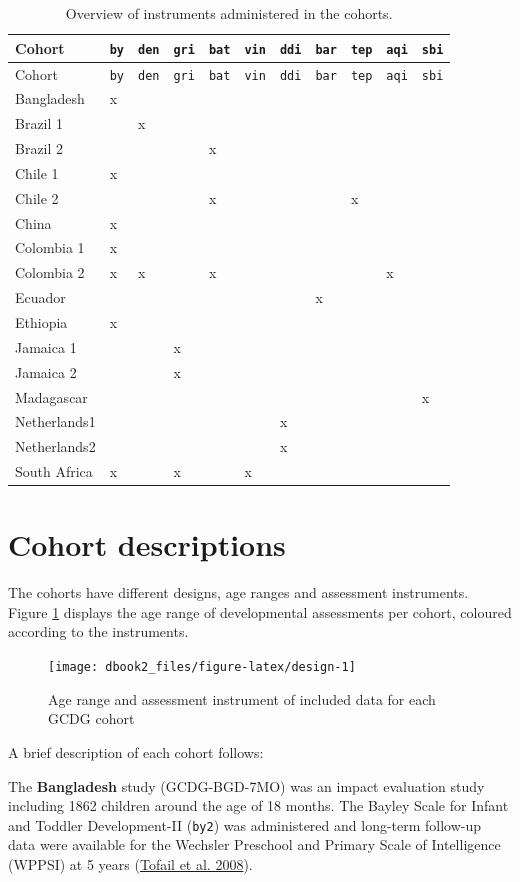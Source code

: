 \documentclass[
]{book}
\begin{document}
\begin{longtable}[]{@{}lllllllllll@{}}
\caption{\label{tab:cohorts} Overview of instruments administered in the cohorts.}\tabularnewline
\toprule
Cohort & \texttt{by} & \texttt{den} & \texttt{gri} & \texttt{bat} & \texttt{vin} & \texttt{ddi} & \texttt{bar} & \texttt{tep} & \texttt{aqi} & \texttt{sbi}\tabularnewline
\midrule
\endfirsthead
\toprule
Cohort & \texttt{by} & \texttt{den} & \texttt{gri} & \texttt{bat} & \texttt{vin} & \texttt{ddi} & \texttt{bar} & \texttt{tep} & \texttt{aqi} & \texttt{sbi}\tabularnewline
\midrule
\endhead
Bangladesh & x & & & & & & & & &\tabularnewline
Brazil 1 & & x & & & & & & & &\tabularnewline
Brazil 2 & & & & x & & & & & &\tabularnewline
Chile 1 & x & & & & & & & & &\tabularnewline
Chile 2 & & & & x & & & & x & &\tabularnewline
China & x & & & & & & & & &\tabularnewline
Colombia 1 & x & & & & & & & & &\tabularnewline
Colombia 2 & x & x & & x & & & & & x &\tabularnewline
Ecuador & & & & & & & x & & &\tabularnewline
Ethiopia & x & & & & & & & & &\tabularnewline
Jamaica 1 & & & x & & & & & & &\tabularnewline
Jamaica 2 & & & x & & & & & & &\tabularnewline
Madagascar & & & & & & & & & & x\tabularnewline
Netherlands1 & & & & & & x & & & &\tabularnewline
Netherlands2 & & & & & & x & & & &\tabularnewline
South Africa & x & & x & & x & & & & &\tabularnewline
\bottomrule
\end{longtable}

\hypertarget{sec:cohorts}{%
\section{Cohort descriptions}\label{sec:cohorts}}

The cohorts have different designs, age ranges and assessment instruments. Figure \ref{fig:design} displays the age range of developmental assessments per cohort, coloured according to the instruments.

\begin{figure}

{\centering \texttt{[image: dbook2\_files/figure-latex/design-1]} 

}

\caption{Age range and assessment instrument of included data for each GCDG cohort}\label{fig:design}
\end{figure}



A brief description of each cohort follows:

The \textbf{Bangladesh} study (GCDG-BGD-7MO) was an impact evaluation study including 1862 children around the age of 18 months. The Bayley Scale for Infant and Toddler Development-II (\texttt{by2}) was administered and long-term follow-up data were available for the Wechsler Preschool and Primary Scale of Intelligence (WPPSI) at 5 years (\protect\hyperlink{ref-Tofail2008}{Tofail et al. 2008}).
\end{document}
